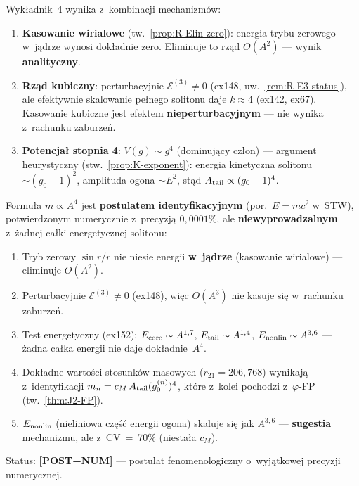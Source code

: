 \begin{remark}%
\label{rem:R-parity}
Wyk\l{}adnik~4 wynika z~kombinacji mechanizm\'ow:
\begin{enumerate}[nosep]
  \item \textbf{Kasowanie wirialowe} (tw.~\ref{prop:R-Elin-zero}):
    energia trybu zerowego w~j\k{a}drze wynosi dok\l{}adnie zero.
    Eliminuje to rz\k{a}d $O(A^2)$ --- wynik \textbf{analityczny}.
  \item \textbf{Rz\k{a}d kubiczny}: perturbacyjnie
    $\mathcal{E}^{(3)} \neq 0$ (ex148, uw.~\ref{rem:R-E3-status}),
    ale efektywnie skalowanie pe\l{}nego solitonu daje $k \approx 4$
    (ex142, ex67). Kasowanie kubiczne jest efektem
    \textbf{nieperturbacyjnym} --- nie wynika z~rachunku zaburze\'n.
  \item \textbf{Potencja\l{} stopnia 4}: $V(g) \sim g^4$
    (dominuj\k{a}cy cz\l{}on) --- argument heurystyczny
    (stw.~\ref{prop:K-exponent}): energia kinetyczna solitonu
    $\sim (g_0-1)^2$, amplituda ogona $\sim E^2$,
    st\k{a}d $A_{\rm tail} \propto (g_0-1)^4$.
\end{enumerate}
\end{remark}

\begin{remark}\label{rem:R-physical}
Formu\l{}a $m \propto A^4$ jest \textbf{postulatem identyfikacyjnym}
(por.\ $E = mc^2$ w~STW), potwierdzonym numerycznie z~precyzj\k{a}
$0{,}0001\%$, ale \textbf{niewyprowadzalnym} z~\.zadnej ca\l{}ki
energetycznej solitonu:
\begin{enumerate}[nosep]
  \item Tryb zerowy $\sin r/r$ nie niesie energii \textbf{w~j\k{a}drze}
    (kasowanie wirialowe) --- eliminuje $O(A^2)$.
  \item Perturbacyjnie $\mathcal{E}^{(3)} \neq 0$ (ex148),
    wi\k{e}c $O(A^3)$ nie kasuje si\k{e} w~rachunku zaburze\'n.
  \item Test energetyczny (ex152): $E_{\rm core} \sim A^{1{,}7}$,
    $E_{\rm tail} \sim A^{1{,}4}$, $E_{\rm nonlin} \sim A^{3{,}6}$
    --- \.zadna ca\l{}ka energii nie daje dok\l{}adnie~$A^4$.
  \item Dok\l{}adne warto\'sci stosunk\'ow masowych
    ($r_{21} = 206{,}768$) wynikaj\k{a} z~identyfikacji
    $m_n = c_M\,A_{\rm tail}(g_0^{(n)})^4$,
    kt\'ore z~kolei pochodzi z~$\varphi$-FP
    (tw.~\ref{thm:J2-FP}).
  \item $E_{\rm nonlin}$ (nieliniowa cz\k{e}\'s\'c energii ogona)
    skaluje si\k{e} jak $A^{3{,}6}$ --- \textbf{sugestia} mechanizmu,
    ale z~CV~=~70\% (niesta\l{}a $c_M$).
\end{enumerate}
Status: \textbf{[POST+NUM]} --- postulat fenomenologiczny o~wyj\k{a}tkowej
precyzji numerycznej.
\end{remark}

